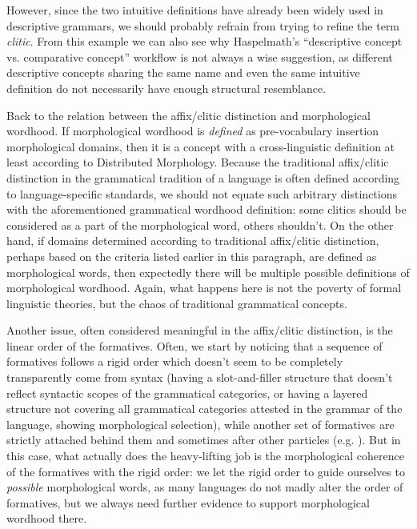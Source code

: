 \documentclass[a4paper, oneside, scheme=plain, 12pt]{article}
\newcommand*{\citesec}[1]{\S~{#1}}
\newcommand*{\term}[1]{\emph{#1}}
\begin{document}
However, since the two intuitive definitions have already been widely used in descriptive grammars, we should probably refrain from trying to refine the term \term{clitic}.
From this example we can also see why Haspelmath's ``descriptive concept vs. comparative concept'' workflow is not always a wise suggestion,
as different descriptive concepts sharing the same name and even the same intuitive definition do not necessarily have enough structural resemblance.

Back to the relation between the affix/clitic distinction and morphological wordhood.
If morphological wordhood is \emph{defined} as pre-vocabulary insertion morphological domains, then it is a concept with a cross-linguistic definition at least according to Distributed Morphology.
Because the traditional affix/clitic distinction in the grammatical tradition of a language  is often defined according to language-specific standards,
we should not equate such arbitrary distinctions with the aforementioned grammatical wordhood definition:
some clitics should be considered as a part of the morphological word, others shouldn't.
On the other hand, if domains determined according to traditional affix/clitic distinction, perhaps based on the criteria listed earlier in this paragraph, are defined as morphological words, then expectedly there will be multiple possible definitions of morphological wordhood. 
Again, what happens here is not the poverty of formal linguistic theories,
but the chaos of traditional grammatical concepts.

Another issue, often considered meaningful in the affix/clitic distinction, is the linear order of the formatives.
Often, we start by noticing that a sequence of formatives follows a rigid order
which doesn't seem to be completely transparently come from syntax
(having a slot-and-filler structure that doesn't reflect syntactic scopes of the grammatical categories, or having a layered structure not covering all grammatical categories attested in the grammar of the language, showing morphological selection),
while another set of formatives are strictly attached behind them and sometimes after other particles
(e.g. \citealt[\citesec{11.6.2}]{jacques2021grammar}).
But in this case, what actually does the heavy-lifting job
is the morphological coherence of the formatives with the rigid order:
we let the rigid order to guide ourselves to \emph{possible} morphological words,
as many languages do not madly alter the order of formatives,
but we always need further evidence to support morphological wordhood there.
\end{document}
